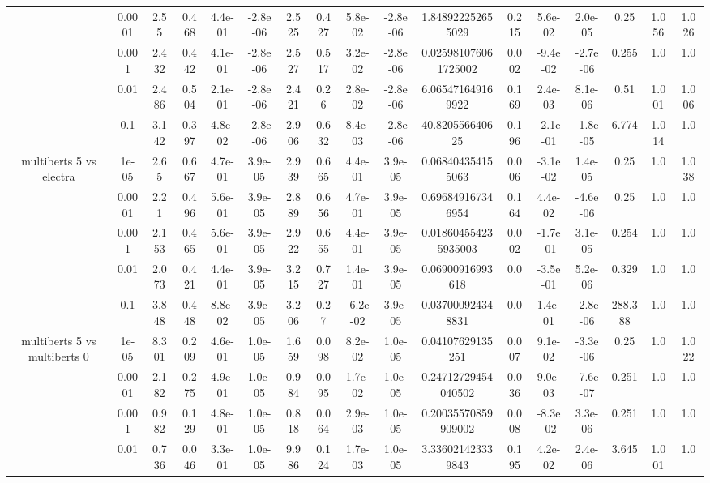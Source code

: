 \begin{tabular}{|c|c|c|c|c|c|c|c|c|c|c|c|c|c|c|c|c|}
 & 0.0001 & 2.55 & 0.468 & 4.4e-01 & -2.8e-06 & 2.525 & 0.427 & 5.8e-02 & -2.8e-06 & 1.848922252655029 & 0.215 & 5.6e-02 & 2.0e-05 & 0.25 & 1.056 & 1.026 \\
 & 0.001 & 2.432 & 0.442 & 4.1e-01 & -2.8e-06 & 2.527 & 0.517 & 3.2e-02 & -2.8e-06 & 0.025981076061725002 & 0.002 & -9.4e-02 & -2.7e-06 & 0.255 & 1.0 & 1.0 \\
 & 0.01 & 2.486 & 0.504 & 2.1e-01 & -2.8e-06 & 2.421 & 0.26 & 2.8e-02 & -2.8e-06 & 6.065471649169922 & 0.169 & 2.4e-03 & 8.1e-06 & 0.51 & 1.001 & 1.006 \\
 & 0.1 & 3.142 & 0.397 & 4.8e-02 & -2.8e-06 & 2.906 & 0.632 & 8.4e-03 & -2.8e-06 & 40.820556640625 & 0.196 & -2.1e-01 & -1.8e-05 & 6.774 & 1.014 & 1.0 \\
\hline
\multirow{5}{*}{multiberts 5 vs electra } & 1e-05 & 2.65 & 0.667 & 4.7e-01 & 3.9e-05 & 2.939 & 0.665 & 4.4e-01 & 3.9e-05 & 0.068404354155063 & 0.006 & -3.1e-02 & 1.4e-05 & 0.25 & 1.0 & 1.038 \\
 & 0.0001 & 2.21 & 0.496 & 5.6e-01 & 3.9e-05 & 2.889 & 0.656 & 4.7e-01 & 3.9e-05 & 0.696849167346954 & 0.164 & 4.4e-02 & -4.6e-06 & 0.25 & 1.0 & 1.0 \\
 & 0.001 & 2.153 & 0.465 & 5.6e-01 & 3.9e-05 & 2.922 & 0.655 & 4.4e-01 & 3.9e-05 & 0.018604554235935003 & 0.002 & -1.7e-01 & 3.1e-05 & 0.254 & 1.0 & 1.0 \\
 & 0.01 & 2.073 & 0.421 & 4.4e-01 & 3.9e-05 & 3.215 & 0.727 & 1.4e-01 & 3.9e-05 & 0.06900916993618 & 0.0 & -3.5e-01 & 5.2e-06 & 0.329 & 1.0 & 1.0 \\
 & 0.1 & 3.848 & 0.448 & 8.8e-02 & 3.9e-05 & 3.206 & 0.27 & -6.2e-02 & 3.9e-05 & 0.037000924348831 & 0.0 & 1.4e-01 & -2.8e-06 & 288.388 & 1.0 & 1.0 \\
\hline
\multirow{5}{*}{multiberts 5 vs multiberts 0} & 1e-05 & 8.301 & 0.209 & 4.6e-01 & 1.0e-05 & 1.659 & 0.098 & 8.2e-02 & 1.0e-05 & 0.04107629135251 & 0.007 & 9.1e-02 & -3.3e-06 & 0.25 & 1.0 & 1.022 \\
 & 0.0001 & 2.182 & 0.275 & 4.9e-01 & 1.0e-05 & 0.984 & 0.095 & 1.7e-02 & 1.0e-05 & 0.24712729454040502 & 0.036 & 9.0e-03 & -7.6e-07 & 0.251 & 1.0 & 1.0 \\
 & 0.001 & 0.982 & 0.129 & 4.8e-01 & 1.0e-05 & 0.818 & 0.064 & 2.9e-03 & 1.0e-05 & 0.20035570859909002 & 0.008 & -8.3e-02 & 3.3e-06 & 0.251 & 1.0 & 1.0 \\
 & 0.01 & 0.736 & 0.046 & 3.3e-01 & 1.0e-05 & 9.986 & 0.124 & 1.7e-03 & 1.0e-05 & 3.336021423339843 & 0.195 & 4.2e-02 & 2.4e-06 & 3.645 & 1.001 & 1.0 \\

\end{tabular}
